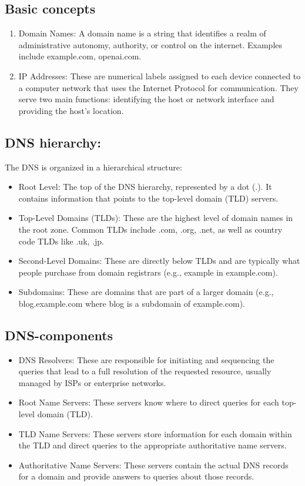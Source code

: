 \subsection{Basic concepts}
\begin{enumerate}
	\item Domain Names:  A domain name is a string that identifies a realm of administrative autonomy, authority, or control on the internet. Examples include example.com, openai.com.
	
	\item IP Addresses: These are numerical labels assigned to each device connected to a computer network that uses the Internet Protocol for communication. They serve two main functions: identifying the host or network interface and providing the host's location.
\end{enumerate}
\subsection{DNS hierarchy:}
The DNS is organized in a hierarchical structure:

\begin{itemize}
	\item Root Level: The top of the DNS hierarchy, represented by a dot (.). It contains information that points to the top-level domain (TLD) servers.
	
	\item Top-Level Domains (TLDs): These are the highest level of domain names in the root zone. Common TLDs include .com, .org, .net, as well as country code TLDs like .uk, .jp.
	\item Second-Level Domains: These are directly below TLDs and are typically what people purchase from domain registrars (e.g., example in example.com).
	\item Subdomains: These are domains that are part of a larger domain (e.g., blog.example.com where blog is a subdomain of example.com).
\end{itemize}
\subsection{DNS-components}
\begin{itemize}
	\item DNS Resolvers: These are responsible for initiating and sequencing the queries that lead to a full resolution of the requested resource, usually managed by ISPs or enterprise networks.\\
	\item Root Name Servers: These servers know where to direct queries for each top-level domain (TLD).\\
	\item TLD Name Servers: These servers store information for each domain within the TLD and direct queries to the appropriate authoritative name servers.\\
	\item Authoritative Name Servers: These servers contain the actual DNS records for a domain and provide answers to queries about those records.
\end{itemize}

